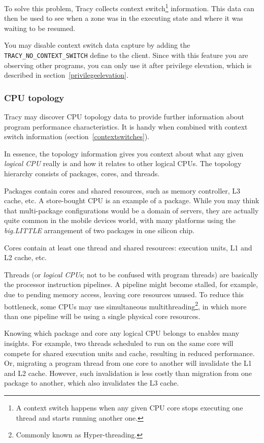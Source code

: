 \documentclass[hidelinks,titlepage,a4paper]{article}
\begin{document}
To solve this problem, Tracy collects context switch\footnote{A context switch happens when any given CPU core stops executing one thread and starts running another one.} information. This data can then be used to see when a zone was in the executing state and where it was waiting to be resumed.

You may disable context switch data capture by adding the \texttt{TRACY\_NO\_CONTEXT\_SWITCH} define to the client. Since with this feature you are observing other programs, you can only use it after privilege elevation, which is described in section~\ref{privilegeelevation}.

\subsubsection{CPU topology}
\label{cputopology}

Tracy may discover CPU topology data to provide further information about program performance characteristics. It is handy when combined with context switch information (section~\ref{contextswitches}).

In essence, the topology information gives you context about what any given \emph{logical CPU} really is and how it relates to other logical CPUs. The topology hierarchy consists of packages, cores, and threads.

Packages contain cores and shared resources, such as memory controller, L3 cache, etc. A store-bought CPU is an example of a package. While you may think that multi-package configurations would be a domain of servers, they are actually quite common in the mobile devices world, with many platforms using the \emph{big.LITTLE} arrangement of two packages in one silicon chip.

Cores contain at least one thread and shared resources: execution units, L1 and L2 cache, etc.

Threads (or \emph{logical CPUs}; not to be confused with program threads) are basically the processor instruction pipelines. A pipeline might become stalled, for example, due to pending memory access, leaving core resources unused. To reduce this bottleneck, some CPUs may use simultaneous multithreading\footnote{Commonly known as Hyper-threading.}, in which more than one pipeline will be using a single physical core resources.

Knowing which package and core any logical CPU belongs to enables many insights. For example, two threads scheduled to run on the same core will compete for shared execution units and cache, resulting in reduced performance. Or, migrating a program thread from one core to another will invalidate the L1 and L2 cache. However, such invalidation is less costly than migration from one package to another, which also invalidates the L3 cache.
\end{document}
